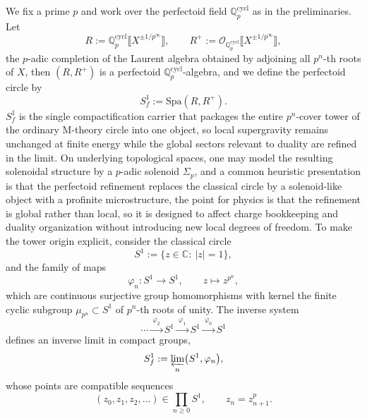 \documentclass[11pt]{article}
\theoremstyle{remark}
\newcommand{\C}{\mathbb{C}}
\newcommand{\Q}{\mathbb{Q}}
\begin{document}
We fix a prime \(p\) and work over the perfectoid field \(\Q_p^{\mathrm{cycl}}\) as in the preliminaries. Let
\begin{equation}\label{13}
R:=\Q_p^{\mathrm{cycl}}\llbracket X^{\pm 1/p^\infty}\rrbracket,\qquad R^+:=\mathcal{O}_{\Q_p^{\mathrm{cycl}}}\llbracket X^{\pm 1/p^\infty}\rrbracket,
\end{equation}
the \(p\)-adic completion of the Laurent algebra obtained by adjoining all \(p^n\)-th roots of \(X\), then \((R,R^+)\) is a perfectoid \(\Q_p^{\mathrm{cycl}}\)-algebra, and we define the perfectoid circle by
\begin{equation}\label{14}
S_f^1:=\mathrm{Spa}(R,R^+).
\end{equation}
 \(S_f^1\) is the single compactification carrier that packages the entire \(p^n\)-cover tower of the ordinary M-theory circle into one object, so local supergravity remains unchanged at finite energy while the global sectors relevant to duality are refined in the limit. On underlying topological spaces, one may model the resulting solenoidal structure by a \(p\)-adic solenoid \(\Sigma_p\), and a common heuristic presentation is that the perfectoid refinement replaces the classical circle by a solenoid-like object with a profinite microstructure, the point for physics is that the refinement is global rather than local, so it is designed to affect charge bookkeeping and duality organization without introducing new local degrees of freedom. To make the tower origin explicit, consider the classical circle
\begin{equation}\label{16}
S^1:=\{z\in\C:\ |z|=1\},
\end{equation}
and the family of maps
\begin{equation}\label{18}
\varphi_n:S^1\to S^1,\qquad z\mapsto z^{p^n},
\end{equation}
which are continuous surjective group homomorphisms with kernel the finite cyclic subgroup \(\mu_{p^n}\subset S^1\) of \(p^n\)-th roots of unity. The inverse system
\begin{equation}\label{19}
\cdots \xrightarrow{\ \varphi_2\ } S^1 \xrightarrow{\ \varphi_1\ } S^1 \xrightarrow{\ \varphi_0\ } S^1
\end{equation}
defines an inverse limit in compact groups,
\begin{equation}\label{20}
S_f^1:=\varprojlim_{n}\bigl(S^1,\varphi_n\bigr),
\end{equation}
whose points are compatible sequences
\begin{equation}\label{21}
(z_0,z_1,z_2,\ldots)\in \prod_{n\ge 0} S^1,\qquad z_n=z_{n+1}^{p}.
\end{equation}
\end{document}
